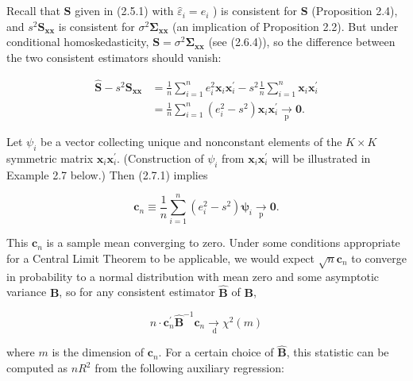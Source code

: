\documentclass[10pt]{article}
\begin{document}
Recall that $\widehat{\mathbf{S}}$ given in (2.5.1) with $\hat{\varepsilon}_{i}=e_{i}$ ) is consistent for $\mathbf{S}$ (Proposition 2.4), and $s^{2} \mathbf{S}_{\mathbf{x x}}$ is consistent for $\sigma^{2} \boldsymbol{\Sigma}_{\mathbf{x x}}$ (an implication of Proposition 2.2). But under conditional homoskedasticity, $\mathbf{S}=\sigma^{2} \boldsymbol{\Sigma}_{\mathbf{x x}}$ (see (2.6.4)), so the difference between the two consistent estimators should vanish:


\begin{align*}
\widehat{\mathbf{S}}-s^{2} \mathbf{S}_{\mathbf{x x}} & =\frac{1}{n} \sum_{i=1}^{n} e_{i}^{2} \mathbf{x}_{i} \mathbf{x}_{i}^{\prime}-s^{2} \frac{1}{n} \sum_{i=1}^{n} \mathbf{x}_{i} \mathbf{x}_{i}^{\prime} \\
& =\frac{1}{n} \sum_{i=1}^{n}\left(e_{i}^{2}-s^{2}\right) \mathbf{x}_{i} \mathbf{x}_{i}^{\prime} \underset{\mathrm{p}}{\rightarrow} \mathbf{0} . \tag{2.7.1}
\end{align*}


Let $\psi_{i}$ be a vector collecting unique and nonconstant elements of the $K \times K$ symmetric matrix $\mathbf{x}_{i} \mathbf{x}_{i}^{\prime}$. (Construction of $\psi_{i}$ from $\mathbf{x}_{i} \mathbf{x}_{i}^{\prime}$ will be illustrated in Example 2.7 below.) Then (2.7.1) implies


\begin{equation*}
\mathbf{c}_{n} \equiv \frac{1}{n} \sum_{i=1}^{n}\left(e_{i}^{2}-s^{2}\right) \boldsymbol{\psi}_{i} \underset{\mathrm{p}}{\rightarrow} \mathbf{0} . \tag{2.7.2}
\end{equation*}


This $\mathbf{c}_{n}$ is a sample mean converging to zero. Under some conditions appropriate for a Central Limit Theorem to be applicable, we would expect $\sqrt{n} \mathbf{c}_{n}$ to converge in probability to a normal distribution with mean zero and some asymptotic variance $\mathbf{B}$, so for any consistent estimator $\widehat{\mathbf{B}}$ of $\mathbf{B}$,


\begin{equation*}
n \cdot \mathbf{c}_{n}^{\prime} \widehat{\mathbf{B}}^{-1} \mathbf{c}_{n} \underset{\mathrm{~d}}{\rightarrow} \chi^{2}(m) \tag{2.7.3}
\end{equation*}


where $m$ is the dimension of $\mathbf{c}_{n}$. For a certain choice of $\widehat{\mathbf{B}}$, this statistic can be computed as $n R^{2}$ from the following auxiliary regression:
\end{document}
